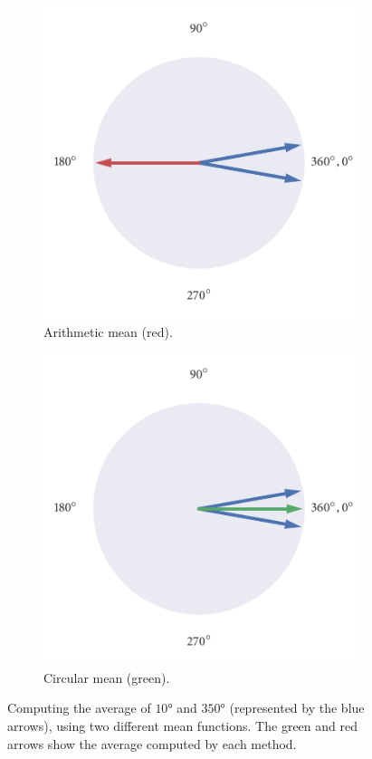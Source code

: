 \begin{figure}
	\begin{subfigure}[b]{0.45\textwidth}
		\includegraphics{arith_mean.pdf}
		\caption{Arithmetic mean (red).}
		\label{subfig:arith_mean}
	\end{subfigure}%
	\hspace{0.05\textwidth}
	\begin{subfigure}[b]{0.45\textwidth}
		\includegraphics{circ_mean.pdf}
		\caption{Circular mean (green).}
		\label{subfig:circ_mean}
	\end{subfigure}
    \caption{Computing the average of $\ang{10}$ and $\ang{350}$ (represented by the blue
    arrows), using two different mean functions. The green and red arrows show the
    average computed by each method.}
	\label{fig:visualise_mean}
\end{figure}

